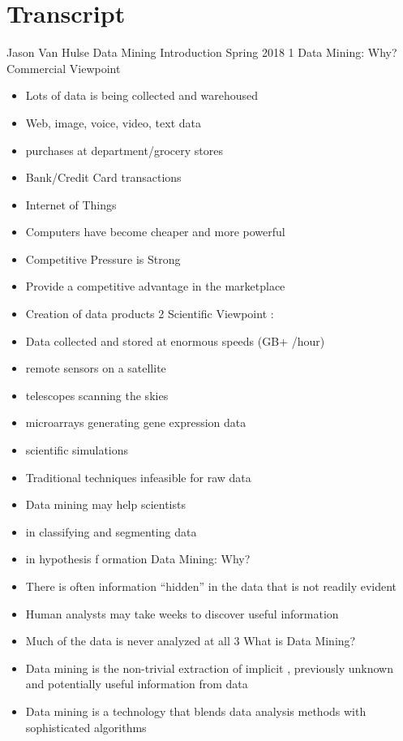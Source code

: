 \documentclass{amsbook}
\theoremstyle{plain}
\numberwithin{section}{chapter}
\numberwithin{equation}{chapter}
\theoremstyle{definition}
\theoremstyle{remark}
\begin{document}
\section{Transcript}


Jason Van Hulse
Data Mining
Introduction
Spring 2018
1
Data Mining: Why?  
Commercial Viewpoint

\begin{itemize}
\item
Lots of data is being collected and 
warehoused 
\item
Web, image, voice, video, 
text data
\item
purchases at department/grocery 
stores
\item
Bank/Credit Card transactions
\item
Internet of Things
\item
Computers have become cheaper and more 
powerful
\item
Competitive Pressure is Strong 
\item
Provide a competitive advantage in the 
marketplace
\item
Creation of data products
2
Scientific Viewpoint
:
\item
Data collected and stored at enormous 
speeds (GB+
/hour)
\item
remote sensors on a satellite
\item
telescopes scanning the skies
\item
microarrays generating gene 
expression data
\item
scientific simulations
\item
Traditional techniques infeasible for 
raw data
\item
Data mining may help scientists 
\item
in classifying and segmenting data
\item
in hypothesis f
ormation
Data Mining: Why?  
\item
There is often information “hidden” in the data that is 
not readily evident
\item
Human analysts may take weeks to discover useful 
information
\item
Much of the data is never analyzed at all
3
What is Data Mining?
\item
Data mining is the 
non-trivial extraction
 of 
implicit
, 
previously 
unknown
 and 
potentially useful
 information from data
\item
Data mining is a technology that blends 
data analysis
 methods 
with 
sophisticated algorithms

\end{itemize}
\end{document}
